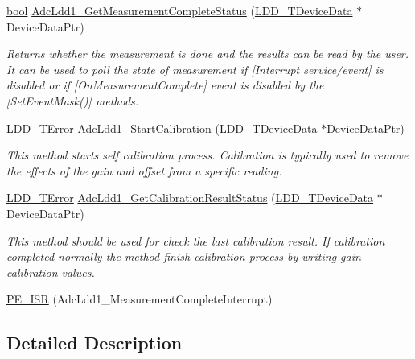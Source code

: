 \begin{DoxyCompactItemize}
\hyperlink{group___p_e___types__module_ga97a80ca1602ebf2303258971a2c938e2}{bool} \hyperlink{group___adc_ldd1__module_ga4df44002c6ba3479f104deedd98b7e4e}{Adc\+Ldd1\+\_\+\+Get\+Measurement\+Complete\+Status} (\hyperlink{group___p_e___types__module_gac5cf1362f1f0e3a2ce71b1bf2276d091}{L\+D\+D\+\_\+\+T\+Device\+Data} $\ast$Device\+Data\+Ptr)
\begin{DoxyCompactList}\small\item\em Returns whether the measurement is done and the results can be read by the user. It can be used to poll the state of measurement if \mbox{[}Interrupt service/event\mbox{]} is disabled or if \mbox{[}On\+Measurement\+Complete\mbox{]} event is disabled by the \mbox{[}Set\+Event\+Mask()\mbox{]} methods. \end{DoxyCompactList}\item 
\hyperlink{group___p_e___types__module_ga24c2b045fd04e79e85f261ce4df35588}{L\+D\+D\+\_\+\+T\+Error} \hyperlink{group___adc_ldd1__module_gab9d49b5f1a7ef34cde56046754ebb62a}{Adc\+Ldd1\+\_\+\+Start\+Calibration} (\hyperlink{group___p_e___types__module_gac5cf1362f1f0e3a2ce71b1bf2276d091}{L\+D\+D\+\_\+\+T\+Device\+Data} $\ast$Device\+Data\+Ptr)
\begin{DoxyCompactList}\small\item\em This method starts self calibration process. Calibration is typically used to remove the effects of the gain and offset from a specific reading. \end{DoxyCompactList}\item 
\hyperlink{group___p_e___types__module_ga24c2b045fd04e79e85f261ce4df35588}{L\+D\+D\+\_\+\+T\+Error} \hyperlink{group___adc_ldd1__module_gaeec76afa5d4906636d7b7acd8a4008d3}{Adc\+Ldd1\+\_\+\+Get\+Calibration\+Result\+Status} (\hyperlink{group___p_e___types__module_gac5cf1362f1f0e3a2ce71b1bf2276d091}{L\+D\+D\+\_\+\+T\+Device\+Data} $\ast$Device\+Data\+Ptr)
\begin{DoxyCompactList}\small\item\em This method should be used for check the last calibration result. If calibration completed normally the method finish calibration process by writing gain calibration values. \end{DoxyCompactList}\item 
\hyperlink{group___adc_ldd1__module_ga563031e4594799f73a2a64dbdc65ea00}{P\+E\+\_\+\+I\+SR} (Adc\+Ldd1\+\_\+\+Measurement\+Complete\+Interrupt)
\end{DoxyCompactItemize}


\subsection{Detailed Description}


